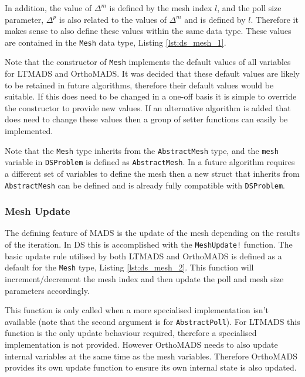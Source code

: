 In addition, the value of $\Delta^m$ is defined by the mesh index $l$, and the poll size parameter, $\Delta^p$ is also related to the values of $\Delta^m$ and is defined by $l$. Therefore it makes sense to also define these values within the same data type. These values are contained in the \texttt{Mesh} data type, Listing \ref{lst:ds_mesh_1}.

\begin{figure}[h]
    
\end{figure}

Note that the constructor of \texttt{Mesh} implements the default values of all variables for LTMADS and OrthoMADS. It was decided that these default values are likely to be retained in future algorithms, therefore their default values would be suitable. If this does need to be changed in a one-off basis it is simple to override the constructor to provide new values. If an alternative algorithm is added that does need to change these values then a group of setter functions can easily be implemented.

Note that the \texttt{Mesh} type inherits from the \texttt{AbstractMesh} type, and the \texttt{mesh} variable in \texttt{DSProblem} is defined as \texttt{AbstractMesh}. In a future algorithm requires a different set of variables to define the mesh then a new struct that inherits from \texttt{AbstractMesh} can be defined and is already fully compatible with \texttt{DSProblem}.

\subsubsection{Mesh Update}

The defining feature of MADS is the update of the mesh depending on the results of the iteration. In DS this is accomplished with the \texttt{MeshUpdate!} function. The basic update rule utilised by both LTMADS and OrthoMADS is defined as a default for the \texttt{Mesh} type, Listing \ref{lst:ds_mesh_2}. This function will increment/decrement the mesh index and then update the poll and mesh size parameters accordingly.

This function is only called when a more specialised implementation isn't available (note that the second argument is for \texttt{AbstractPoll}). For LTMADS this function is the only update behaviour required, therefore a specialised implementation is not provided. However OrthoMADS needs to also update internal variables at the same time as the mesh variables. Therefore OrthoMADS provides its own update function to ensure its own internal state is also updated.

